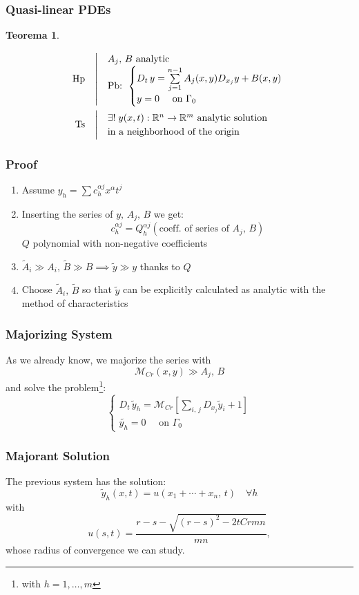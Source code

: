 \documentclass[serif,notheorems]{beamer}
\makeatletter
\newenvironment{ipotesi}%
{\quad\left|\quad\def\arraystretch{1.2}\begin{array}{@{}l@{}}}%
{\end{array}\right.}
\newcommand{\hpth}[2]
{
\begin{align*}
\quad
\text{Hp}
&\begin{ipotesi}
#1
\end{ipotesi}\\
\text{Ts}
&\begin{ipotesi}
#2
\end{ipotesi}
\end{align*}
}
\theoremstyle{definition} %
\newtheorem{theorem}{Teorema}[section] %
\theoremstyle{remark}
\makeatother
\begin{document}
\begin{frame}
\frametitle{Quasi-linear PDEs}
\begin{theorem}\label{teoquasilin}
\hpth{
A_j , \, B\text{ analytic }\\
\text{Pb: }
\begin{cases}
D_t \, y = \sum\limits_{j=1}^{n-1} A_j(x,y)D_{x_j}y+B(x,y) \; \\
y=0 \quad \text{ on } \Gamma_0
\end{cases}
\\
}{
\exists ! \; y(x,t): \mathbb{R}^n \rightarrow \mathbb{R}^m
\text{ analytic solution } \\ \text{in a neighborhood of the origin}
}
\end{theorem}
\end{frame}

\begin{frame}
\frametitle{Proof}
\begin{enumerate}
\item Assume $y_h = \sum c_h^{\alpha j} x^\alpha t^j$
\item Inserting the series of $y,\, A_j,\, B$ we get: 
$$ c_h^{\alpha j} = Q_h^{\alpha j}(\text{coeff. of series of }A_j, \, B)$$
$Q$ polynomial with non-negative coefficients
\item $\widetilde{A}_i \gg A_i, \, \widetilde{B} \gg B \implies \widetilde{y} \gg y$ thanks to $Q$
\item Choose $\widetilde{A}_i, \, \widetilde{B}$ so that $\widetilde{y}$ can be explicitly calculated as analytic with the method of characteristics
\end{enumerate}
\end{frame}

\begin{frame}
\frametitle{Majorizing System}
As we already know, we majorize the series with 
$$\mathcal{M}_{Cr}(x,y) \gg A_j,\, B$$
and solve the problem\footnote{with $h=1,\ldots, m$}:
\begin{equation*}
\begin{cases}
D_t \, \widetilde{y}_h = \mathcal{M}_{Cr} \left[\sum\limits_{i,\, j} D_{x_j}\widetilde{y}_i+1 \right] \\
\widetilde{y_h}=0 \quad \text{ on } \Gamma_0
\end{cases}
\end{equation*}
\end{frame}

\begin{frame}
\frametitle{Majorant Solution}
The previous system has the solution:
$$\widetilde{y}_h(x,t)=u(x_1+\cdots +x_n,\,t) \quad \forall h$$
with
$$u(s,t)=\frac{r-s-\sqrt{(r-s)^2-2tCrmn}}{mn},$$
whose radius of convergence we can study.
\end{frame}
\end{document}
